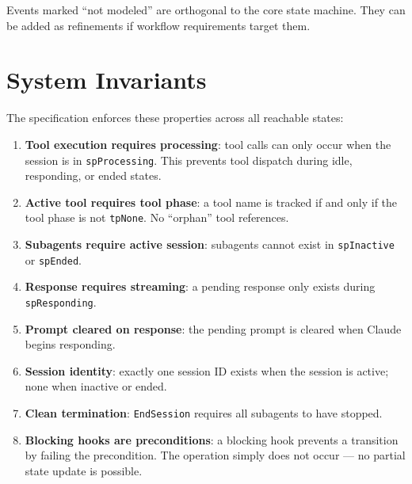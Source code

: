 \documentclass[a4paper,10pt,fleqn]{article}
\begin{document}
Events marked ``not modeled'' are orthogonal to the core state machine.
They can be added as refinements if workflow requirements target them.

\section{System Invariants}

The specification enforces these properties across all reachable states:

\begin{enumerate}
  \item \textbf{Tool execution requires processing}: tool calls can only
    occur when the session is in \texttt{spProcessing}. This prevents
    tool dispatch during idle, responding, or ended states.

  \item \textbf{Active tool requires tool phase}: a tool name is tracked
    if and only if the tool phase is not \texttt{tpNone}. No ``orphan''
    tool references.

  \item \textbf{Subagents require active session}: subagents cannot exist
    in \texttt{spInactive} or \texttt{spEnded}.

  \item \textbf{Response requires streaming}: a pending response only
    exists during \texttt{spResponding}.

  \item \textbf{Prompt cleared on response}: the pending prompt is
    cleared when Claude begins responding.

  \item \textbf{Session identity}: exactly one session ID exists when
    the session is active; none when inactive or ended.

  \item \textbf{Clean termination}: \texttt{EndSession} requires all
    subagents to have stopped.

  \item \textbf{Blocking hooks are preconditions}: a blocking hook
    prevents a transition by failing the precondition. The operation
    simply does not occur --- no partial state update is possible.
\end{enumerate}

\end{document}
